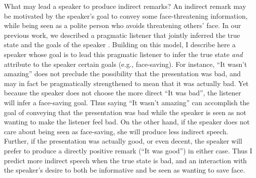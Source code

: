 What may lead a speaker to produce indirect remarks? An indirect remark
may be motivated by the speaker's goal to convey some face-threatening
information, while being seen as a polite person who avoids threatening
others' face. In our previous work, we described a pragmatic listener
that jointly inferred the true state and the goals of the speaker \citep{yoon2016}.
Building on this model, I describe here a speaker whose goal is to lead
this pragmatic listener to infer the true state \emph{and} attribute to
the speaker certain goals (e.g., face-saving). For instance, ``It wasn't
amazing'' does not preclude the possibility that the presentation was
bad, and may in fact be pragmatically strengthened to mean that it was
actually bad. Yet because the speaker does not choose the more direct
``It was bad'', the listener will infer a face-saving goal. Thus saying
``It wasn't amazing'' can accomplish the goal of conveying that the
presentation was bad while the speaker is seen as not wanting to make
the listener feel bad. On the other hand, if the speaker does not care
about being seen as face-saving, she will produce less indirect speech.
Further, if the presentation was actually good, or even decent, the
speaker will prefer to produce a directly positive remark (``It was
good'') in either case. Thus I predict more indirect speech when the
true state is bad, and an interaction with the speaker's desire to both
be informative and be seen as wanting to save face. 

%


